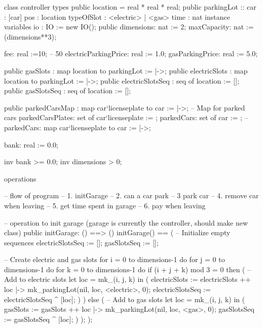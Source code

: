\documentclass[a4paper]{article}
\begin{document}
\title{}
\author{}
\begin{vdm_al}
class controller
types
public location = real * real * real;
public parkingLot ::
        car : [car]
        pos : location
        typeOfSlot : <electric> | <gas>
        time : nat
instance variables
    io : IO := new IO();
    public dimensions: nat := 2;
    maxCapacity: nat := (dimensions**3);

    fee: real :=10; --  50%
    electricParkingPrice: real := 1.0;
    gasParkingPrice: real := 5.0;

    
    public gasSlots : map location to parkingLot := {|->};
    public electricSlots : map location to parkingLot := {|->};
    public electricSlotsSeq : seq of location := [];
    public gasSlotsSeq : seq of location := [];

    public parkedCarsMap : map car`licenseplate to car := {|->};  -- Map for parked cars
    parkedCarsPlates: set of car`licenseplate := {};
    parkedCars: set of car := {};
    --parkedCars: map car`licenseplate to car := {|->};

    bank: real := 0.0;

inv bank >= 0.0;
inv dimensions > 0;

operations

-- flow of program
-- 1. initGarage
-- 2. can a car park
-- 3  park car
-- 4. remove car when leaving
-- 5. get time spent in garage
-- 6. pay when leaving

-- operation to init garage (garage is currently the controller, should make new class)
public initGarage: () ==> ()
initGarage() ==
(
    -- Initialize empty sequences
    electricSlotsSeq := [];
    gasSlotsSeq := [];

    -- Create electric and gas slots
    for i = 0 to dimensions-1 do
        for j = 0 to dimensions-1 do
            for k = 0 to dimensions-1 do
                if (i + j + k) mod 3 = 0 then
                (
                    -- Add to electric slots
                    let loc = mk_(i, j, k) in
                    (
                        electricSlots := electricSlots ++ {loc |-> mk_parkingLot(nil, loc, <electric>, 0)};
                        electricSlotsSeq := electricSlotsSeq ^ [loc];
                    )
                )
                else
                (
                    -- Add to gas slots
                    let loc = mk_(i, j, k) in
                    (
                        gasSlots := gasSlots ++ {loc |-> mk_parkingLot(nil, loc, <gas>, 0)};
                        gasSlotsSeq := gasSlotsSeq ^ [loc];
                    )
                );
);




\end{vdm_al}
\end{document}
